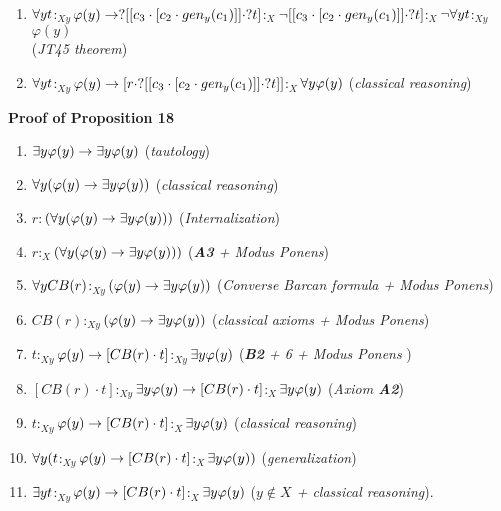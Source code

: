 \begin{enumerate}[1.]
\item $\forall y t$$:_{Xy}$$\varphi(y) \rightarrow ?[[c_{3} \cdot [c_{2} \cdot gen_{y}(c_{1})]]\cdot ?t]$$:_{X}$$\neg[[c_{3} \cdot [c_{2} \cdot gen_{y}(c_{1})]]\cdot ?t]$$:_{X}$$\neg \forall y t$$:_{Xy}$$\varphi(y)$ \\ (\textit{JT45 theorem})

\item$\forall y t$$:_{Xy}$$\varphi(y) \rightarrow [r \cdot ?[[c_{3} \cdot [c_{2} \cdot gen_{y}(c_{1})]]\cdot ?t]]$$:_{X}$$\forall y \varphi(y)$ (\textit{classical reasoning})
\end{enumerate}



\textbf{Proof of Proposition 18}

\begin{enumerate}[1.]
	\item $ \exists y \varphi(y) \rightarrow \exists y \varphi(y)$   (\textit{tautology})
	
	\item $ \forall y (\varphi(y) \rightarrow \exists y \varphi(y))$   (\textit{classical reasoning})
	
	\item $r$$:$$(\forall y (\varphi(y) \rightarrow \exists y \varphi(y)))$   (\textit{Internalization})
	
	\item $r$$:_{X}$$(\forall y (\varphi(y) \rightarrow \exists y \varphi(y)))$  (\textit{\textbf{A3} + Modus Ponens})
	
	\item $\forall y CB(r)$$:_{Xy}$$ (\varphi(y) \rightarrow \exists y \varphi(y))$  (\textit{Converse Barcan formula + Modus Ponens})
	
	\item $CB(r)$$:_{Xy}$$(\varphi(y) \rightarrow \exists y \varphi(y))$  (\textit{classical axioms + Modus Ponens})
		
	\item $t$$:_{Xy}$$\varphi(y) \rightarrow [CB(r) \cdot t]$$:_{Xy}$$ \exists y \varphi(y)$  	 (\textit{\textbf{B2} + 6 + Modus Ponens })
	

	\item $[CB(r) \cdot t]$$:_{Xy}$$ \exists y \varphi(y) \rightarrow [CB(r) \cdot t]$$:_{X}$$ \exists y \varphi(y)$  (\textit{Axiom \textbf{A2}})
	
	\item $t$$:_{Xy}$$\varphi(y) \rightarrow [CB(r) \cdot t]$$:_{X}$$ \exists y \varphi(y)$  	 (\textit{classical reasoning})
	
	\item $\forall y (t$$:_{Xy}$$\varphi(y) \rightarrow [CB(r) \cdot t]$$:_{X}$$ \exists y \varphi(y))$  	 (\textit{generalization})
	
	\item $\exists y t$$:_{Xy}$$\varphi(y) \rightarrow [CB(r) \cdot t]$$:_{X}$$ \exists y \varphi(y)$  	 (\textit{$y \notin X$ + classical reasoning}).
	
	
\end{enumerate}





